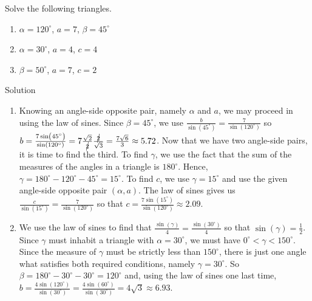 \begin{example}
\label{losex} Solve the following triangles. 
\begin{multicols}{2}

\begin{enumerate}

\item   $\alpha = 120^{\circ}$, $a = 7$, $\beta = 45^{\circ}$
\item  $\alpha = 30^{\circ}$, $a=4$, $c = 4$
\item   $\beta = 50^{\circ}$, $a = 7$, $c=2$ 

\end{enumerate}

\end{multicols}

Solution 

\begin{enumerate}

\item Knowing an angle-side opposite pair, namely $\alpha$ and $a$, we may proceed in using the law of sines.  Since $\beta = 45^{\circ}$, we use $\frac{b}{\sin\left(45^{\circ}\right)} = \frac{7}{\sin\left(120^{\circ}\right)}$ so $b = \frac{7\sin\left(45^{\circ}\right)}{\sin\left(120^{\circ}\right)} = 7\frac{\sqrt{2}}{\cancel{2}}\frac{\cancel{2}}{\sqrt{3}}= \frac{7\sqrt{6}}{3} \approx 5.72$.  Now that we have two angle-side pairs, it is time to find the third.  To find $\gamma$, we use the fact that the sum of the measures of the angles in a triangle is $180^{\circ}$. Hence, $\gamma = 180^{\circ} - 120^{\circ} - 45^{\circ} = 15^{\circ}$.  To find $c$, we use $\gamma = 15^{\circ}$ and use the given angle-side opposite pair $(\alpha, a)$. The law of sines gives us  $\frac{c}{\sin\left(15^{\circ}\right)} = \frac{7}{\sin\left(120^{\circ}\right)}$ so that $c = \frac{7\sin\left(15^{\circ}\right)}{\sin\left(120^{\circ}\right)} \approx 2.09$.


\item  We use  the  law of sines  to find that $\frac{\sin(\gamma)}{4} = \frac{\sin\left(30^{\circ}\right)}{4}$ so that $\sin(\gamma) = \frac{1}{2}$.  Since $\gamma$ must inhabit a triangle with $\alpha = 30^{\circ}$, we must have $0^{\circ} < \gamma < 150^{\circ}$.   Since the  measure of $\gamma$ must be strictly less than $150^{\circ}$, there is just one angle what satisfies both required conditions, namely $\gamma = 30^{\circ}$.  So $\beta = 180^{\circ} - 30^{\circ} - 30^{\circ} = 120^{\circ}$ and, using the law of sines one last time, $b = \frac{4\sin\left(120^{\circ}\right)}{\sin\left(30^{\circ}\right)} =\frac{4\sin\left(60^{\circ}\right)}{\sin\left(30^{\circ}\right)} = 4\sqrt{3} \approx 6.93$.


\end{enumerate}
\end{example}
